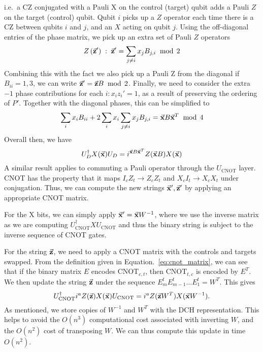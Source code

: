 i.e.~a CZ conjugated with a Pauli X on the control (target) qubit adds a Pauli $Z$ on the target (control) qubit. Qubit $i$ picks up a $Z$ operator each time there is a CZ between qubits $i$ and $j$, and an $X$ acting on qubit $j$. Using the off-diagonal entries of the phase matrix, we pick up an extra set of Pauli $Z$ operators
\[Z\left(\va{z}'\right)\;:\;\va{z}' = \sum_{j\neq i}x_{j}B_{j,i}\;\bmod\,2\]
Combining this with the fact we also pick up a Pauli Z from the diagonal if $B_{ii}=1,3$, we can write $\va{z}'=\va{z}B\;\bmod\,2$. Finally, we need to consider the extra $-1$ phase  contributions for each $i:x_{i}z_{i}'=1$, as a result of preserving the ordering of $P'$. Together with the diagonal phases, this can be simplified to
\[
\sum_{i}x_{i}B_{ii} + 2\sum_{i}x_{i}\sum_{j\neq i}x_{j}B_{j,i} = \va{x}B\va{x}^{T}\;\bmod\, 4
\]
Overall then, we have
\begin{equation}
U_{D}^{\dagger}X(\va{x})U_{D} = i^{\va{x}B\va{x}^{T}}Z(\va{x}B)X(\va{x})
\label{eq:dch_dupdate}
\end{equation}
A similar result applies to commuting a Pauli operator through the $U_{\text{CNOT}}$ layer. CNOT has the property that it maps $I_{c}Z_{t}\rightarrow Z_{c}Z_{t}$ and $X_{c}I_{t}\rightarrow X_{c}X_{t}$ under conjugation. Thus, we can compute the new strings $\va{x}',\va{z}'$ by applying an appropriate CNOT matrix.\par
For the X bits, we can simply apply $\va{x}'=\va{x}W^{-1}$, where we use the inverse matrix as we are computing $U_{\text{CNOT}}^{\dagger} X U_{\text{CNOT}}$ and thus the binary string is subject to the inverse sequence of CNOT gates. \par
For the string $\va{z}$, we need to apply a CNOT matrix with the controls and targets swapped. From the definition given in Equation.~\ref{eq:cnot_matrix}, we can see that if the binary matrix $E$ encodes $\text{CNOT}_{c,t}$, then $\text{CNOT}_{t,c}$ is encoded by $E^{T}$. We then update the string $\va{z}$ under the sequence $E_{m}^{t}E_{m-1}^{t}\dots E_{1}^{t} = W^{T}$. This gives
\begin{equation}
U_{\text{CNOT}}^{\dagger}i^{a}Z(\va{z})X(\va{x})U_{\text{CNOT}} = i^{a}Z(\va{z}W^{T})X(\va{x}W^{-1}).
\label{eq:dch_cupdate}
\end{equation}
As mentioned, we store copies of $W^{-1}$ and $W^{T}$ with the DCH representation. This helps to avoid the $O(n^{3})$ computational cost associated with inverting $W$, and the $O(n^{2})$ cost of transposing $W$. We can thus compute this update in time $O(n^{2})$.\par
